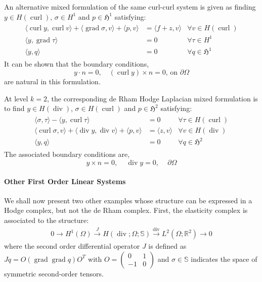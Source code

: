 \documentclass{article}
\DeclareMathOperator{\grad}{grad}
\DeclareMathOperator{\curl}{curl}
\DeclareMathOperator{\divergence}{div}
\newcommand{\f}[1]{\mathfrak{#1}}
\begin{document}
An alternative mixed formulation of the same curl-curl system is given as finding $y\in H(\curl)$, $\sigma\in H^1$ and $p\in\f H^1$ satisfying:
\begin{align}
	\begin{array}{rll}
		\langle \curl y, \curl v \rangle
		+
		\langle \grad \sigma, v \rangle
		+
		\langle p,v \rangle
		 & = \langle f+z,v \rangle
		 & \forall v \in H(\curl)
		\\
		\langle y, \grad \tau \rangle
		 & = 0
		 & \forall \tau \in H^{1}
		\\
		\langle y, q \rangle
		 & = 0
		 & \forall q \in \mathfrak H^1
	\end{array}
\end{align}
It can be shown that the boundary conditions,
\[
	y\cdot n = 0,\quad (\curl y)\times n = 0,\,\text{on }\partial \Omega
\]
are natural in this formulation.

At level $k=2$, the corresponding de Rham Hodge Laplacian mixed formulation is to find $y\in H(\divergence)$, $\sigma\in H(\curl)$ and $p\in\f H^2$ satisfying:
\begin{align}
	\begin{array}{rll}
		\langle \sigma, \tau \rangle - \langle y, \curl \tau \rangle
		 & = 0
		 & \forall \tau \in H(\curl)
		\\
		\langle \curl\sigma,v \rangle + \langle \divergence y, \divergence v \rangle + \langle p,v \rangle
		 & = \langle z,v \rangle
		 & \forall v \in H(\divergence)
		\\
		\langle y, q \rangle
		 & = 0
		 & \forall q \in \mathfrak H^2
	\end{array}
\end{align}
The associated boundary conditions are,
\[
y\times n = 0,\,\quad \divergence y = 0,\,\quad \partial\Omega
\]

\paragraph{Other First Order Linear Systems}
We shall now present two other examples whose structure can be expressed in a Hodge complex, but not the de Rham complex.
First, the elasticity complex is associated to the structure:
\begin{gather*}
	0\to H^1(\Omega) \overset{J}{\to} H(\divergence;\Omega;\mathbb{S})\overset{\divergence}{\to} L^2(\Omega;\mathbb{R}^2)\to 0
\end{gather*}
where the second order differential operator $J$
is defined as $Jq=O(\grad\grad q)O^T$ with $O=\begin{pmatrix} 0 & 1 \\ -1 & 0 \end{pmatrix}$ and
$\sigma \in\mathbb{S}$ indicates the space of symmetric second-order tensors.
\end{document}
